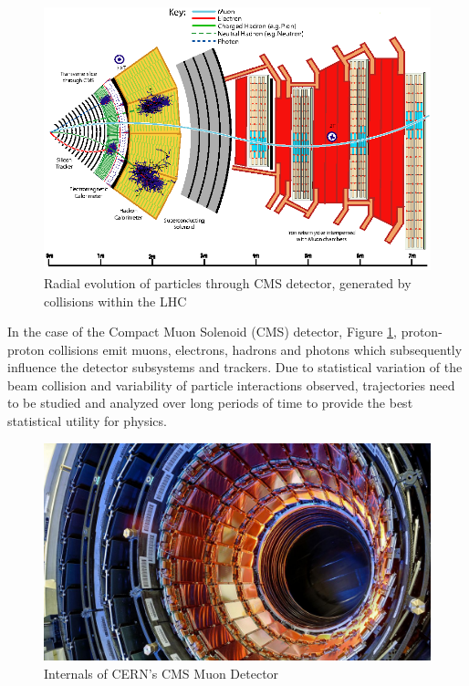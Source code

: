 \begin{figure}
    \centering
    \includegraphics{figs/cms_detector.jpg}
    \caption{Radial evolution of particles through CMS detector, generated by collisions within the LHC}
    \label{fig:cms}
\end{figure}

In the case of the Compact Muon Solenoid (CMS) detector, Figure \ref{fig:cms}, proton-proton collisions emit muons, electrons, hadrons and photons which  subsequently influence the detector subsystems and trackers. Due to statistical variation of the beam collision and variability of particle interactions observed, trajectories need to be studied and analyzed over long periods of time to provide the best statistical utility for physics.

\begin{figure}
    \centering
    \includegraphics{figs/sn-LHC.jpg}
    \caption{Internals of CERN's CMS Muon Detector}
    \label{fig:cms_internals}
\end{figure}

